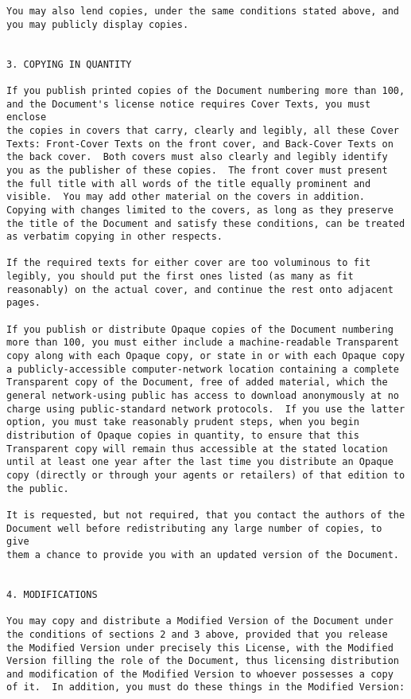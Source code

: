 \documentclass{report}
\begin{document}
\begin{verbatim}
You may also lend copies, under the same conditions stated above, and
you may publicly display copies.


3. COPYING IN QUANTITY

If you publish printed copies of the Document numbering more than 100,
and the Document's license notice requires Cover Texts, you must enclose
the copies in covers that carry, clearly and legibly, all these Cover
Texts: Front-Cover Texts on the front cover, and Back-Cover Texts on
the back cover.  Both covers must also clearly and legibly identify
you as the publisher of these copies.  The front cover must present
the full title with all words of the title equally prominent and
visible.  You may add other material on the covers in addition.
Copying with changes limited to the covers, as long as they preserve
the title of the Document and satisfy these conditions, can be treated
as verbatim copying in other respects.

If the required texts for either cover are too voluminous to fit
legibly, you should put the first ones listed (as many as fit
reasonably) on the actual cover, and continue the rest onto adjacent
pages.

If you publish or distribute Opaque copies of the Document numbering
more than 100, you must either include a machine-readable Transparent
copy along with each Opaque copy, or state in or with each Opaque copy
a publicly-accessible computer-network location containing a complete
Transparent copy of the Document, free of added material, which the
general network-using public has access to download anonymously at no
charge using public-standard network protocols.  If you use the latter
option, you must take reasonably prudent steps, when you begin
distribution of Opaque copies in quantity, to ensure that this
Transparent copy will remain thus accessible at the stated location
until at least one year after the last time you distribute an Opaque
copy (directly or through your agents or retailers) of that edition to
the public.

It is requested, but not required, that you contact the authors of the
Document well before redistributing any large number of copies, to give
them a chance to provide you with an updated version of the Document.


4. MODIFICATIONS

You may copy and distribute a Modified Version of the Document under
the conditions of sections 2 and 3 above, provided that you release
the Modified Version under precisely this License, with the Modified
Version filling the role of the Document, thus licensing distribution
and modification of the Modified Version to whoever possesses a copy
of it.  In addition, you must do these things in the Modified Version:


\end{verbatim}
\end{document}
